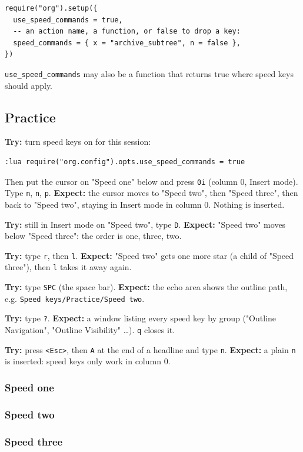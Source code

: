\begin{verbatim}
require("org").setup({
  use_speed_commands = true,
  -- an action name, a function, or false to drop a key:
  speed_commands = { x = "archive_subtree", n = false },
})
\end{verbatim}

\texttt{use\_speed\_commands} may also be a function that returns true where speed
keys should apply.
\subsection{Practice}
\label{sec:org99967f4}
\textbf{Try:} turn speed keys on for this session:
\begin{verbatim}
:lua require("org.config").opts.use_speed_commands = true
\end{verbatim}
Then put the cursor on "Speed one" below and press \texttt{0i} (column 0, Insert
mode). Type \texttt{n}, \texttt{n}, \texttt{p}.
\textbf{Expect:} the cursor moves to "Speed two", then "Speed three", then back
to "Speed two", staying in Insert mode in column 0. Nothing is inserted.

\textbf{Try:} still in Insert mode on "Speed two", type \texttt{D}.
\textbf{Expect:} "Speed two" moves below "Speed three": the order is one,
three, two.

\textbf{Try:} type \texttt{r}, then \texttt{l}.
\textbf{Expect:} "Speed two" gets one more star (a child of "Speed three"),
then \texttt{l} takes it away again.

\textbf{Try:} type \texttt{SPC} (the space bar).
\textbf{Expect:} the echo area shows the outline path, e.g.
\texttt{Speed keys/Practice/Speed two}.

\textbf{Try:} type \texttt{?}.
\textbf{Expect:} a window listing every speed key by group ("Outline
Navigation", "Outline Visibility" \ldots{}). \texttt{q} closes it.

\textbf{Try:} press \texttt{<Esc>}, then \texttt{A} at the end of a headline and type \texttt{n}.
\textbf{Expect:} a plain \texttt{n} is inserted: speed keys only work in column 0.
\subsubsection{Speed one}
\label{sec:org8f24d88}
\subsubsection{Speed two}
\label{sec:org26715ee}
\subsubsection{Speed three}
\label{sec:org29e3bf9}
